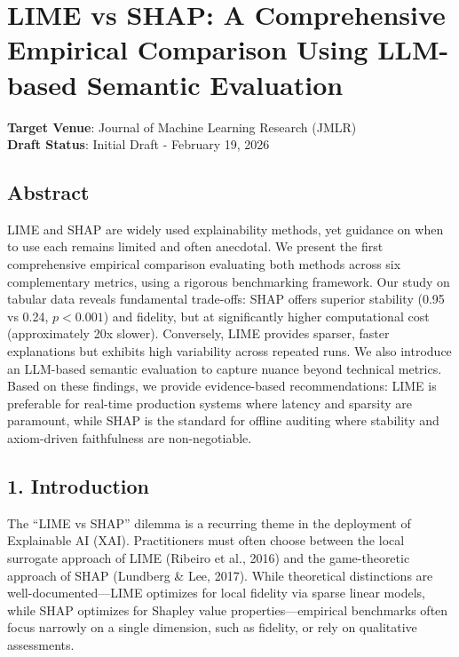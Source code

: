 \documentclass[
]{article}
\author{}
\date{}
\begin{document}
\hypertarget{lime-vs-shap-a-comprehensive-empirical-comparison-using-llm-based-semantic-evaluation}{%
\section{LIME vs SHAP: A Comprehensive Empirical Comparison Using
LLM-based Semantic
Evaluation}\label{lime-vs-shap-a-comprehensive-empirical-comparison-using-llm-based-semantic-evaluation}}

\textbf{Target Venue}: Journal of Machine Learning Research (JMLR)\\
\textbf{Draft Status}: Initial Draft - February 19, 2026

\hypertarget{abstract}{%
\subsection{Abstract}\label{abstract}}

LIME and SHAP are widely used explainability methods, yet guidance on
when to use each remains limited and often anecdotal. We present the
first comprehensive empirical comparison evaluating both methods across
six complementary metrics, using a rigorous benchmarking framework. Our
study on tabular data reveals fundamental trade-offs: SHAP offers
superior stability (0.95 vs 0.24, \(p<0.001\)) and fidelity, but at
significantly higher computational cost (approximately 20x slower).
Conversely, LIME provides sparser, faster explanations but exhibits high
variability across repeated runs. We also introduce an LLM-based
semantic evaluation to capture nuance beyond technical metrics. Based on
these findings, we provide evidence-based recommendations: LIME is
preferable for real-time production systems where latency and sparsity
are paramount, while SHAP is the standard for offline auditing where
stability and axiom-driven faithfulness are non-negotiable.

\hypertarget{introduction}{%
\subsection{1. Introduction}\label{introduction}}

The ``LIME vs SHAP'' dilemma is a recurring theme in the deployment of
Explainable AI (XAI). Practitioners must often choose between the local
surrogate approach of LIME (Ribeiro et al., 2016) and the game-theoretic
approach of SHAP (Lundberg \& Lee, 2017). While theoretical distinctions
are well-documented---LIME optimizes for local fidelity via sparse
linear models, while SHAP optimizes for Shapley value
properties---empirical benchmarks often focus narrowly on a single
dimension, such as fidelity, or rely on qualitative assessments.
\end{document}
